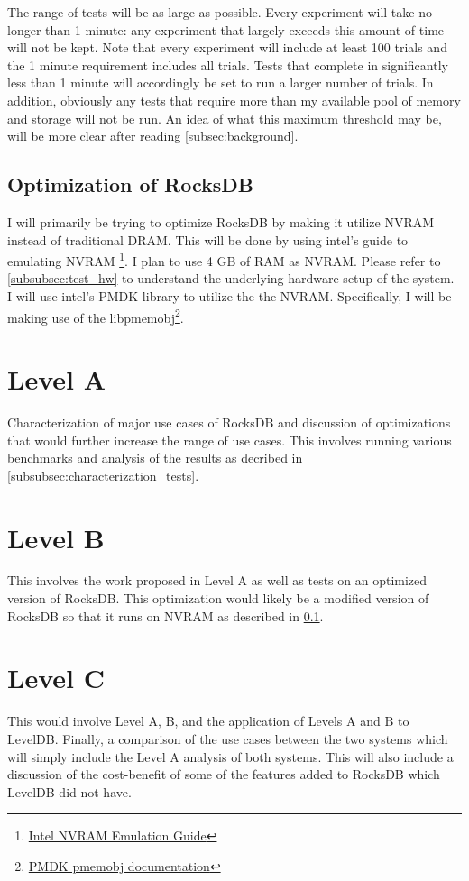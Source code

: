 \documentclass{article}
\begin{document}
The range of tests will be as large as possible. Every experiment will take no
longer than 1 minute: any experiment that largely exceeds this amount of time
will not be kept. Note that every experiment will include at least 100 trials
and the 1 minute requirement includes all trials. Tests that complete in
significantly less than 1 minute will accordingly be set to run a larger number
of trials. In addition, obviously any tests that require more than my available
pool of memory and storage will not be run. An idea of what this maximum
threshold may be, will be more clear after reading \ref{subsec:background}.

\subsection{Optimization of RocksDB}
\label{subsec:opt_rocksdb}

I will primarily be trying to optimize RocksDB by making it utilize NVRAM
instead of traditional DRAM. This will be done by using intel's guide to
emulating NVRAM
\footnote{
  \href{https://software.intel.com/en-us/articles/how-to-emulate-persistent-memory-on-an-intel-architecture-server/}
  {Intel NVRAM Emulation Guide}}.
I plan to use 4 GB of RAM as NVRAM. Please refer to \ref{subsubsec:test_hw} to
understand the underlying hardware setup of the system. I will use intel's PMDK
library to utilize the the NVRAM. Specifically, I will be making use of the
libpmemobj\footnote{\href{http://pmem.io/pmdk/libpmemobj/}
{PMDK pmemobj documentation}}.

\section{Level A}

Characterization of major use cases of RocksDB and discussion of optimizations
that would further increase the range of use cases. This involves running
various benchmarks and analysis of the results as decribed in
\ref{subsubsec:characterization_tests}.

\section{Level B}

This involves the work proposed in Level A as well as tests on an optimized
version of RocksDB. This optimization would likely be a modified version of
RocksDB so that it runs on NVRAM as described in \ref{subsec:opt_rocksdb}.

\section{Level C}

This would involve Level A, B, and the application of Levels A and B to LevelDB.
Finally, a comparison of the use cases between the two systems which will simply
include the Level A analysis of both systems. This will also include a
discussion of the cost-benefit of some of the features added to RocksDB which
LevelDB did not have.
\end{document}

